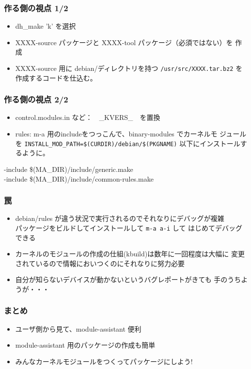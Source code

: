 \documentclass[cjk,dvipdfmx]{beamer}
\begin{document}
\begin{frame}
 \frametitle{作る側の視点 1/2}
 \begin{itemize}
  \item dh\_make 'k' を選択
  \item XXXX-source パッケージと XXXX-tool パッケージ（必須ではない）を
	作成
  \item XXXX-source 用に debian/ディレクトリを持つ
	\texttt{/usr/src/XXXX.tar.bz2} を作成するコードを仕込む。
 \end{itemize}
\end{frame}

\begin{frame}
 \frametitle{作る側の視点 2/2}
 \begin{itemize}
  \item control.modules.in など：　\_KVERS\_　を置換
  \item rules: m-a 用のincludeをつっこんで、binary-modules でカーネルモ
	ジュールを
	\texttt{INSTALL\_MOD\_PATH=\$(CURDIR)/debian/\$(PKGNAME)} 以下にインストールするように。
 \end{itemize}
\begin{texttt}
-include \$(MA\_DIR)/include/generic.make\\
-include \$(MA\_DIR)/include/common-rules.make\\
\end{texttt}
\end{frame}

\begin{frame}
 \frametitle{罠}
 \begin{itemize}
  \item debian/rules が違う状況で実行されるのでそれなりにデバッグが複雑
	\\ パッケージをビルドしてインストールして \texttt{m-a a-i} して
	はじめてデバッグできる
  \item カーネルのモジュールの作成の仕組(kbuild)は数年に一回程度は大幅に
	変更されているので情報においつくのにそれなりに努力必要
  \item 自分が知らないデバイスが動かないというバグレポートがきても
	手のうちようが・・・
 \end{itemize}
\end{frame}

\begin{frame}
 \frametitle{まとめ}
 \begin{itemize}[<+->]
  \item ユーザ側から見て、module-assistant 便利
  \item module-assistant 用のパッケージの作成も簡単
  \item みんなカーネルモジュールをつくってパッケージにしよう!
 \end{itemize}
\end{frame}
\end{document}
